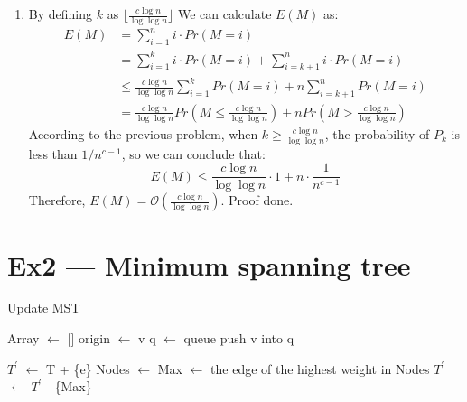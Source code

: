\documentclass[12pt, a4paper]{article}
\begin{document}
\begin{enumerate}
    \item By defining $k$ as $\lfloor \frac{c\log n}{\log \log n} \rfloor$ We can calculate $E(M)$ as: 
          \begin{align*}
            E(M) &= \sum_{i=1}^n i\cdot Pr(M = i)\\
                 &= \sum_{i=1}^{k} i\cdot Pr(M = i) + \sum_{i=k+1}^n i\cdot Pr(M = i)\\
                 &\leq \frac{c\log n}{\log \log n}\sum_{i=1}^k Pr(M = i) + n\sum_{i=k+1}^n Pr(M = i)\\
                 &= \frac{c\log n}{\log \log n} Pr(M \leq \frac{c\log n}{\log \log n}) + n Pr(M > \frac{c\log n}{\log \log n})
          \end{align*}
          According to the previous problem, when $k \geq \frac{c\log n}{\log \log n}$, 
          the probability of $P_k$ is less than $1/n^{c-1}$, so we can conclude that: 
          $$E(M) \leq \frac{c\log n}{\log \log n} \cdot 1 + n \cdot \frac{1}{n^{c-1}}$$
          Therefore, $E(M) = \mathcal{O}(\frac{c\log n}{\log \log n})$. Proof done.

\end{enumerate}

\section*{Ex2 --- Minimum spanning tree}
\begin{algorithm}[H]
    \caption{Update MST}

     {
        Array $\leftarrow$ []\;
        origin $\leftarrow$ v\;
        q $\leftarrow$ queue\;
        push v into q\;

        \;
    }

     {
        $T^\prime$ $\leftarrow$ T + \{e\}\;
        Nodes $\leftarrow$ \;
        Max $\leftarrow$ the edge of the highest weight in Nodes\;
        $T^\prime$ $\leftarrow$ $T^\prime$ - \{Max\}\;
    }

\end{algorithm}
\end{document}
